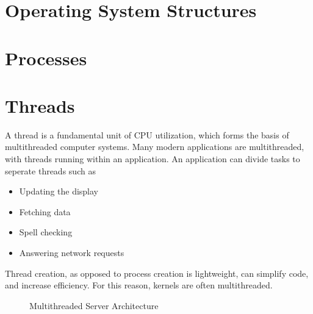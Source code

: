 \documentclass{book}
\begin{document}
    \chapter{Operating System Structures}
    \chapter{Processes}
    \chapter{Threads}
            A thread is a fundamental unit of CPU utilization, which forms the basis of multithreaded computer systems.
            Many modern applications are multithreaded, with threads running within an application. An application can divide tasks to seperate threads
            such as
            \begin{itemize}
                \item Updating the display
                \item Fetching data
                \item Spell checking
                \item Answering network requests
            \end{itemize}
            Thread creation, as opposed to process creation is lightweight, can simplify code, and increase efficiency. For this reason, kernels are often
            multithreaded.
            \begin{figure}[H]
                \centering
                \caption{Multithreaded Server Architecture}
            \end{figure}
\end{document}
